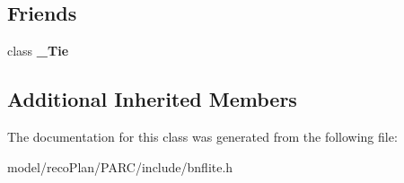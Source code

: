 \subsection*{Friends}
\begin{DoxyCompactItemize}
\item 
\mbox{\label{classbnf_1_1_token_ab555bd08f573aad86ad95feb76007c15}} 
class {\bfseries \+\_\+\+Tie}
\end{DoxyCompactItemize}
\subsection*{Additional Inherited Members}


The documentation for this class was generated from the following file\+:\begin{DoxyCompactItemize}
\item 
model/reco\+Plan/\+P\+A\+R\+C/include/bnflite.\+h\end{DoxyCompactItemize}

